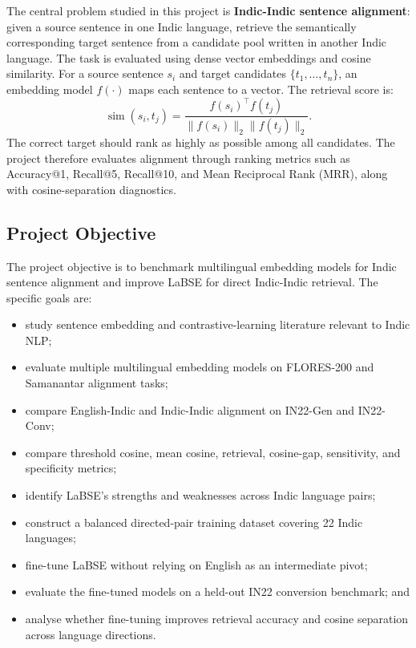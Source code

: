 \documentclass[12pt, a4paper]{article}
\begin{document}
The central problem studied in this project is \textbf{Indic-Indic sentence alignment}: given a source sentence in one Indic language, retrieve the semantically corresponding target sentence from a candidate pool written in another Indic language. The task is evaluated using dense vector embeddings and cosine similarity. For a source sentence $s_i$ and target candidates $\{t_1,\ldots,t_n\}$, an embedding model $f(\cdot)$ maps each sentence to a vector. The retrieval score is:
\[
  \operatorname{sim}(s_i,t_j)
  =
  \frac{f(s_i)^\top f(t_j)}
       {\lVert f(s_i)\rVert_2 \lVert f(t_j)\rVert_2}.
\]
The correct target should rank as highly as possible among all candidates. The project therefore evaluates alignment through ranking metrics such as Accuracy@1, Recall@5, Recall@10, and Mean Reciprocal Rank (MRR), along with cosine-separation diagnostics.

\subsection{Project Objective}

The project objective is to benchmark multilingual embedding models for Indic sentence alignment and improve LaBSE for direct Indic-Indic retrieval. The specific goals are:

\begin{itemize}[leftmargin=1.5cm, itemsep=4pt]
  \item study sentence embedding and contrastive-learning literature relevant to Indic NLP;
  \item evaluate multiple multilingual embedding models on FLORES-200 and Samanantar alignment tasks;
  \item compare English-Indic and Indic-Indic alignment on IN22-Gen and IN22-Conv;
  \item compare threshold cosine, mean cosine, retrieval, cosine-gap, sensitivity, and specificity metrics;
  \item identify LaBSE's strengths and weaknesses across Indic language pairs;
  \item construct a balanced directed-pair training dataset covering 22 Indic languages;
  \item fine-tune LaBSE without relying on English as an intermediate pivot;
  \item evaluate the fine-tuned models on a held-out IN22 conversion benchmark; and
  \item analyse whether fine-tuning improves retrieval accuracy and cosine separation across language directions.
\end{itemize}
\end{document}
